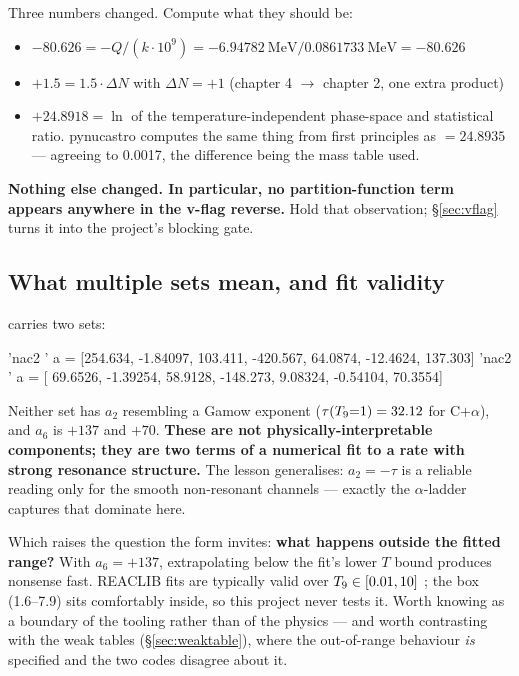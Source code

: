 Three numbers changed. Compute what they should be:

\begin{itemize}
\item $\mathbf{-80.626} = -Q/(k\cdot10^9) = -6.94782\ \text{MeV} / 0.0861733\
      \text{MeV} = \mathbf{-80.626}$ \yes
\item $\mathbf{+1.5} = 1.5\cdot\Delta N$ with $\Delta N = +1$ (chapter 4 $\to$
      chapter 2, one extra product) \yes
\item $\mathbf{+24.8918} = \ln$ of the temperature-independent phase-space and
      statistical ratio. pynucastro computes the same thing from first
      principles as \code{DerivedRate.ratio\_factor} $= \mathbf{24.8935}$ ---
      agreeing to 0.0017, the difference being the mass table used. \yes
\end{itemize}

\begin{warn}
\textbf{Nothing else changed. In particular, no partition-function term appears
anywhere in the v-flag reverse.} Hold that observation; \S\ref{sec:vflag} turns
it into the project's blocking gate.
\end{warn}

\subsection{What multiple sets mean, and fit validity}
\label{sec:multisets}

 carries two sets:

\begin{srclisting}
'nac2  '  a = [254.634, -1.84097, 103.411, -420.567, 64.0874, -12.4624, 137.303]
'nac2  '  a = [ 69.6526, -1.39254, 58.9128, -148.273,  9.08324, -0.54104, 70.3554]
\end{srclisting}

Neither set has $a_2$ resembling a Gamow exponent ($\tau(T_{9}{=}1) = 32.12$ for
C$+\alpha$), and $a_6$ is $+137$ and $+70$. \textbf{These are not
physically-interpretable components; they are two terms of a numerical fit to a
rate with strong resonance structure.} The lesson generalises: $a_2 = -\tau$ is
a reliable reading only for the smooth non-resonant channels --- exactly the
$\alpha$-ladder captures that dominate here.

Which raises the question the form invites: \textbf{what happens outside the
fitted range?} With $a_6 = +137$, extrapolating below the fit's lower $T$ bound
produces nonsense fast. REACLIB fits are typically valid over
$T_{9} \in [0.01, 10]$ \citep{rauscher2000}; the box (1.6--7.9) sits comfortably
inside, so this project never tests it. Worth knowing as a boundary of the
tooling rather than of the physics --- and worth contrasting with the weak
tables (\S\ref{sec:weaktable}), where the out-of-range behaviour \emph{is}
specified and the two codes disagree about it.

